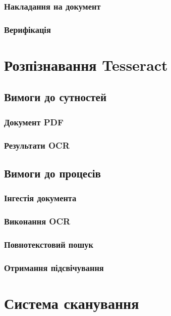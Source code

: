 \subsubsection{Накладання на документ}

\subsubsection{Верифікація}

\newpage
\section{Розпізнавання Tesseract}

\subsection{Вимоги до сутностей}

\subsubsection{Документ PDF}

\subsubsection{Результати OCR}

\subsection{Вимоги до процесів}

\subsubsection{Інгестія документа}

\subsubsection{Виконання OCR}

\subsubsection{Повнотекстовий пошук}

\subsubsection{Отримання підсвічування}

\newpage
\section{Система сканування}

